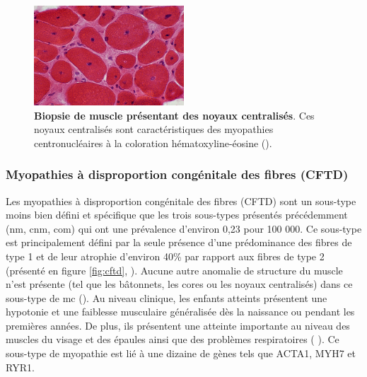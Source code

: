 \begin{figure}[htbp]
 \centering
 \includegraphics[width=0.5\textwidth]{figures/nuc.png}
 \caption[Biopsie de muscle de myopathie centronucléaire.]{\textbf{Biopsie de muscle présentant des noyaux centralisés}. Ces noyaux centralisés sont caractéristiques des myopathies centronucléaires à la coloration hématoxyline-éosine (\cite{alan_pestronk_neuromuscular_2022}).}
 \label{fig:nuc}
\end{figure}

\subsubsection{Myopathies à disproportion congénitale des fibres (CFTD)}
Les myopathies à disproportion congénitale des fibres (CFTD) sont un sous-type moins bien défini et spécifique que les trois sous-types présentés précédemment (\gls{nm}, \gls{cnm}, \gls{com}) qui ont une prévalence d'environ 0,23 pour 100 000. Ce sous-type est principalement défini par la seule présence d'une prédominance des fibres de type 1 et de leur atrophie d'environ 40\% par rapport aux fibres de type 2 (présenté en figure \ref{fig:cftd}, \cite{claeys_congenital_2020} ). Aucune autre anomalie de structure du muscle n'est présente (tel que les bâtonnets, les cores ou les noyaux centralisés) dans ce sous-type de \gls{mc} (\cite{claeys_congenital_2020}). Au niveau clinique, les enfants atteints présentent une hypotonie et une faiblesse musculaire généralisée dès la naissance ou pendant les premières années. De plus, ils présentent une atteinte importante au niveau des muscles du visage et des épaules ainsi que des problèmes respiratoires (\cite{claeys_congenital_2020} ). Ce sous-type de myopathie est lié à une dizaine de gènes tels que ACTA1, MYH7 et RYR1.

